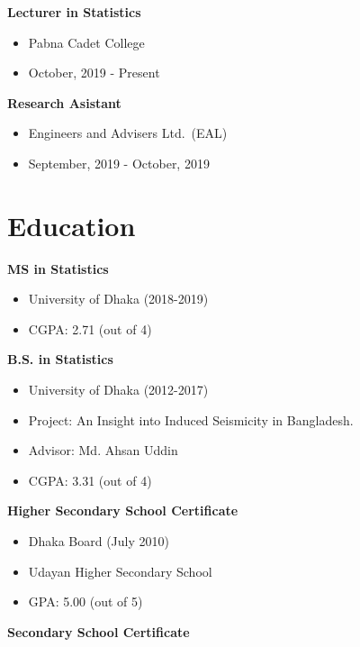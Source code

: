 \documentclass[
]{book}
\providecommand{\tightlist}{%
  \setlength{\itemsep}{0pt}\setlength{\parskip}{0pt}}
\begin{document}
\textbf{Lecturer in Statistics}

\begin{itemize}
\tightlist
\item
  Pabna Cadet College\\
\item
  October, 2019 - Present
\end{itemize}

\textbf{Research Asistant}

\begin{itemize}
\tightlist
\item
  Engineers and Advisers Ltd.~(EAL)
\item
  September, 2019 - October, 2019
\end{itemize}

\hypertarget{education}{%
\chapter*{Education}\label{education}}

\textbf{MS in Statistics}

\begin{itemize}
\tightlist
\item
  University of Dhaka (2018-2019)
\item
  CGPA: 2.71 (out of 4)
\end{itemize}

\textbf{B.S. in Statistics}

\begin{itemize}
\tightlist
\item
  University of Dhaka (2012-2017)
\item
  Project: An Insight into Induced Seismicity in Bangladesh.
\item
  Advisor: Md. Ahsan Uddin
\item
  CGPA: 3.31 (out of 4)
\end{itemize}

\textbf{Higher Secondary School Certificate}

\begin{itemize}
\tightlist
\item
  Dhaka Board (July 2010)
\item
  Udayan Higher Secondary School
\item
  GPA: 5.00 (out of 5)
\end{itemize}

\textbf{Secondary School Certificate}
\end{document}
